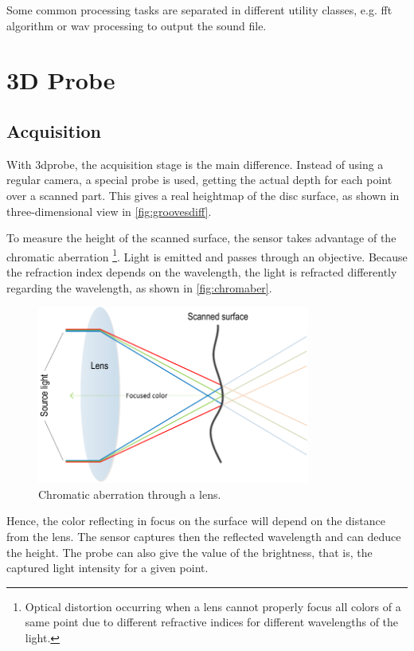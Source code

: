 Some common processing tasks are separated in different utility classes, e.g. \gls{fft} algorithm or \gls{wav} processing to output the sound file.

\section{3D Probe}

\subsection{Acquisition}

With \gls{3dprobe}, the acquisition stage is the main difference. Instead of using a regular camera, a special probe is used, getting the actual depth for each point over a scanned part. This gives a real heightmap of the disc surface, as shown in three-dimensional view in \autoref{fig:groovesdiff}.

To measure the height of the scanned surface, the sensor takes advantage of the chromatic aberration \footnote{Optical distortion occurring when a lens cannot properly focus all colors of a same point due to different refractive indices for different wavelengths of the light.}. Light is emitted and passes through an objective. Because the refraction index depends on the wavelength, the light is refracted differently regarding the wavelength, as shown in \autoref{fig:chromaber}.

\begin{figure}[!ht]
\centering
\includegraphics[width=0.8\textwidth]{images/chromatic-aberration}
\caption{Chromatic aberration through a lens.}
\label{fig:chromaber}
\end{figure}

Hence, the color reflecting in focus on the surface will depend on the distance from the lens. The sensor captures then the reflected wavelength and can deduce the height. The probe can also give the value of the brightness, that is, the captured light intensity for a given point.

